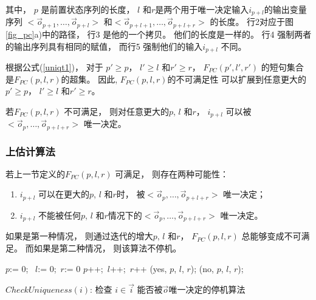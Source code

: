 其中，
$p$ 是前置状态序列的长度，
$l$ 和$r$是两个用于唯一决定输入$i_{p+l}$的输出变量序列
$<\vec{o}_{p+1},\dots,\vec{o}_{p+l}>$ 和$<\vec{o}_{p+l+1},\dots,\vec{o}_{p+l+r}>$
的长度。
行2对应于图\ref{fig_pc}a)中的路径，
行3 是他的一个拷贝。
他们的长度是一样的。
行4 强制两者的输出序列具有相同的赋值，
而行5 强制他们的输入$i_{p+l}$ 不同。

根据公式(\ref{uniqt1})，
对于 $p'\ge p$， $l'\ge l$ 和$r'\ge r$，
$F_{PC}(p',l',r')$ 的短句集合是$F_{PC}(p,l,r)$的超集。
因此,
$F_{PC}(p,l,r)$的不可满足性
可以扩展到任意更大的$p'\ge p$， $l'\ge l$ 和$r'\ge r$。


\begin{proposition}\label{prop_pc1}
若$F_{PC}(p,l,r)$ 不可满足，
则对任意更大的$p$, $l$ 和$r$，
$i_{p+l}$ 可以被$<\vec{o}_{p},\dots,\vec{o}_{p+l+r}>$ 唯一决定。
\end{proposition}


\subsubsection{上估计算法}\label{subsub_complete}

若上一节定义的$F_{PC}(p,l,r)$ 可满足，
则存在两种可能性：
\begin{enumerate}
 \item
$i_{p+l}$ 可以在更大的$p$, $l$ 和$r$时，
被$<\vec{o}_{p},\dots,\vec{o}_{p+l+r}>$ 唯一决定；
 \item
$i_{p+l}$ 不能被任何$p$, $l$ 和$r$情况下的$<\vec{o}_{p},\dots,\vec{o}_{p+l+r}>$ 唯一决定。
\end{enumerate}

如果是第一种情况，
则通过迭代的增大$p$, $l$ 和$r$，
$F_{PC}(p,l,r)$ 总能够变成不可满足。
而如果是第二种情况，
则该算法不停机。



\begin{algorithm}[t]
\begin{algorithmic}[1]
\STATE $p$:= 0; ~$l$:= 0;~$r$:= 0\;
\STATE   $p$++;~$l$++;~$r$++\;\label{linepc1}
    \RETURN (yes, $p$, $l$, $r$);
   \label{lnsat} 
    \RETURN (no, $p$, $l$, $r$);
   \ENDIF
\ENDWHILE
\caption{$CheckUniqueness(i)$: 检查
$i\in\vec{i}$ 能否被$\vec{o}$唯一决定的停机算法}
\label{alg_pcln}
\end{algorithmic}
\end{algorithm}



